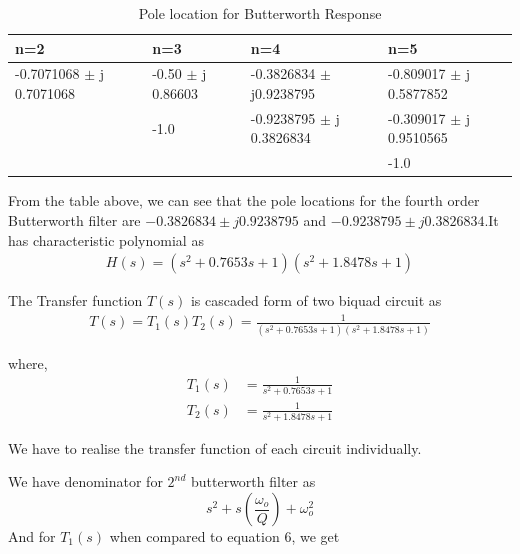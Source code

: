 \documentclass[a4paper,11pt]{article}
\begin{document}
\begin{table}[H]
    \centering
    \begin{tabular}[H]{| m{8em}|m{8em}| m{8em}|m{8em}|}
        \hline
        \rowcolor[rgb]{0.569,0.647,0.947} \textbf{n=2} & \textbf{n=3}                      & \textbf{n=4}                          & \textbf{n=5}                   \\ \hline
        -0.7071068 $ \pm $ j 0.7071068                 & -0.50          $ \pm $ j 0.86603
                                                       & -0.3826834     $ \pm $ j0.9238795 & -0.809017        $ \pm $ j 0.5877852                                   \\  \hline
                                                       & -1.0                              & -0.9238795        $ \pm $ j 0.3826834 & -0.309017  $ \pm $ j 0.9510565 \\  \hline

                                                       &                                   &                                       & -1.0                           \\  \hline
    \end{tabular}
    \caption{Pole location for Butterworth Response}
\end{table}



From the table above, we can see that the pole locations for the fourth order Butterworth filter are $-0.3826834\pm j0.9238795$ and $-0.9238795\pm j0.3826834$.It has characteristic polynomial as
\begin{align*}
    H(s) = (s^2 + \num{ 0.7653 }s + 1)(s^2+\num{ 1.8478 }s + 1)
\end{align*}


The Transfer function  $ T(s)$ is cascaded form of two biquad circuit as
\begin{align}
    T(s) = T_1(s) T_2(s)=\frac{1}{ (s^2 + \num{ 0.7653 }s + 1)(s^2+\num{ 1.8478 }s + 1) }
\end{align}

where,
\begin{align}
    T_1(s) & = \frac{1}{s^2 + \num{ 0.7653 }s + 1} \label{eq:t1} \\
    T_2(s) & = \frac{1}{s^2 + \num{ 1.8478 }s + 1} \label{eq:t2}
\end{align}

We have to realise the transfer function of each circuit individually.

We have denominator for  $2^{nd}$ butterworth filter as
\begin{equation}
    s^2+s\left(\frac{\omega_o}{Q}\right)+\omega_o^2
\end{equation}
And for $T_1(s)$ when compared to equation 6, we get
\end{document}
